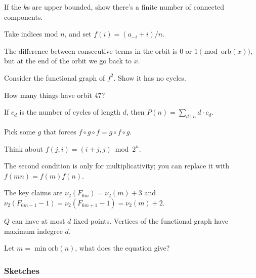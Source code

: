\documentclass[11pt,paper=letter]{scrartcl}
\newcommand{\orb}[1]{\mathrm{orb}(#1)}
\begin{document}
\begin{enumthin}
\item \label{h:15} If the $k$s are upper bounded, show there's a finite number of connected components.
\item \label{h:11} Take indices mod $n$, and set $f(i) = (a_{-i} + i)/n$.
\item \label{h:6} The difference between consecutive terms in the orbit is $0$ or $1 \pmod{\orb{x}}$, but at the end of the orbit we go back to $x$.
\item \label{h:14} Consider the functional graph of $f^2$. Show it has no cycles.
\item \label{h:1} How many things have orbit $47$?
\item \label{h:7} If $c_d$ is the number of cycles of length $d$, then $P(n) = \sum_{d \mid n} d \cdot c_d$.
\item \label{h:27} Pick some $g$ that forces $f \circ g \circ f = g \circ f \circ g$.
\item \label{h:19} Think about $f(j, i) = (i + j, j) \bmod 2^n$.
\item \label{h:9} The second condition is only for multiplicativity; you can replace it with $f(mn) = f(m)f(n)$.
\item \label{h:21} The key claims are $\nu_2(F_{6m}) = \nu_2(m) + 3$ and $\nu_2(F_{6m-1} - 1) = \nu_2(F_{6m+1} - 1) = \nu_2(m) + 2$.
\item \label{h:25} $Q$ can have at most $d$ fixed points. Vertices of the functional graph have maximum indegree $d$.
\item \label{h:5} Let $m = \min \orb{n}$, what does the equation give?
\end{enumthin}

\subsubsection*{Sketches}
\end{document}
